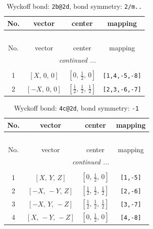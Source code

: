 \documentclass[fleqn,8pt]{jsarticle}
\begin{document}
\renewcommand{\arraystretch}{1.2}
\begin{longtable}{cccc}
\caption{Wyckoff bond: {\tt 2b@2d}, bond symmetry: {\tt 2/m..}}
 \\
 \hline \hline
No. & vector & center & mapping \\ \hline \endfirsthead

\multicolumn{3}{l}{\tablename\ \thetable{}} \\
 \hline \hline
No. & vector & center & mapping \\ \hline \endhead

 \hline \hline
\multicolumn{3}{r}{\footnotesize\it continued ...} \\ \endfoot

 \hline \hline
\multicolumn{3}{r}{} \\ \endlastfoot

1 & $\left[ X,\, 0,\, 0 \right]$ & $\left[ 0,\, \frac{1}{2},\, 0 \right]$ & {\tt [1,4,-5,-8]} \\ \hline
2 & $\left[ - X,\, 0,\, 0 \right]$ & $\left[ \frac{1}{2},\, \frac{1}{2},\, \frac{1}{2} \right]$ & {\tt [2,3,-6,-7]} \\
\end{longtable}
\renewcommand{\arraystretch}{1.2}
\begin{longtable}{cccc}
\caption{Wyckoff bond: {\tt 4c@2d}, bond symmetry: {\tt -1}}
 \\
 \hline \hline
No. & vector & center & mapping \\ \hline \endfirsthead

\multicolumn{3}{l}{\tablename\ \thetable{}} \\
 \hline \hline
No. & vector & center & mapping \\ \hline \endhead

 \hline \hline
\multicolumn{3}{r}{\footnotesize\it continued ...} \\ \endfoot

 \hline \hline
\multicolumn{3}{r}{} \\ \endlastfoot

1 & $\left[ X,\, Y,\, Z \right]$ & $\left[ 0,\, \frac{1}{2},\, 0 \right]$ & {\tt [1,-5]} \\ \hline
2 & $\left[ - X,\, - Y,\, Z \right]$ & $\left[ \frac{1}{2},\, \frac{1}{2},\, \frac{1}{2} \right]$ & {\tt [2,-6]} \\ \hline
3 & $\left[ - X,\, Y,\, - Z \right]$ & $\left[ \frac{1}{2},\, \frac{1}{2},\, \frac{1}{2} \right]$ & {\tt [3,-7]} \\ \hline
4 & $\left[ X,\, - Y,\, - Z \right]$ & $\left[ 0,\, \frac{1}{2},\, 0 \right]$ & {\tt [4,-8]} \\
\end{longtable}
\end{document}
